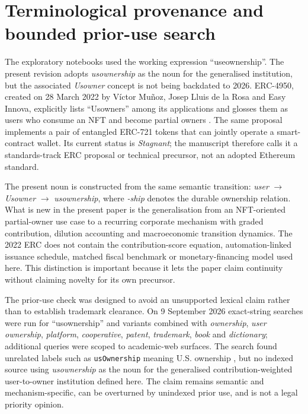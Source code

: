 \section{Terminological provenance and bounded prior-use search}
The exploratory notebooks used the working expression ``useownership''. The present revision adopts \emph{usownership} as the noun for the generalised institution, but the associated \emph{Usowner} concept is not being backdated to 2026. ERC-4950, created on 28 March 2022 by V\'ictor Mu\~noz, Josep Lluis de la Rosa and Easy Innova, explicitly lists ``Usowners'' among its applications and glosses them as users who consume an NFT and become partial owners \citep{erc4950}. The same proposal implements a pair of entangled ERC-721 tokens that can jointly operate a smart-contract wallet. Its current status is \emph{Stagnant}; the manuscript therefore calls it a standards-track ERC proposal or technical precursor, not an adopted Ethereum standard.

The present noun is constructed from the same semantic transition: \emph{user} $\rightarrow$ \emph{Usowner} $\rightarrow$ \emph{usownership}, where \emph{-ship} denotes the durable ownership relation. What is new in the present paper is the generalisation from an NFT-oriented partial-owner use case to a recurring corporate mechanism with graded contribution, dilution accounting and macroeconomic transition dynamics. The 2022 ERC does not contain the contribution-score equation, automation-linked issuance schedule, matched fiscal benchmark or monetary-financing model used here. This distinction is important because it lets the paper claim continuity without claiming novelty for its own precursor.

The prior-use check was designed to avoid an unsupported lexical claim rather than to establish trademark clearance. On 9 September 2026 exact-string searches were run for ``usownership'' and variants combined with \emph{ownership}, \emph{user ownership}, \emph{platform}, \emph{cooperative}, \emph{patent}, \emph{trademark}, \emph{book} and \emph{dictionary}; additional queries were scoped to academic-web surfaces. The search found unrelated labels such as \texttt{usOwnership} meaning U.S. ownership \citep{straitsx2026}, but no indexed source using \emph{usownership} as the noun for the generalised contribution-weighted user-to-owner institution defined here. The claim remains semantic and mechanism-specific, can be overturned by unindexed prior use, and is not a legal priority opinion.

